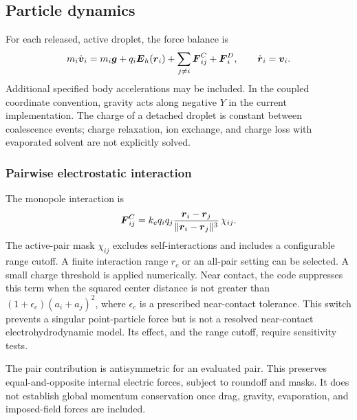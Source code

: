 \subsection{Particle dynamics}
For each released, active droplet, the force balance is
\begin{equation}
 m_i\dot{\boldsymbol{v}}_i=
 m_i\boldsymbol{g}+q_i\boldsymbol{E}_h(\boldsymbol{r}_i)
 +\sum_{j\ne i}\boldsymbol{F}^{C}_{ij}
 +\boldsymbol{F}^D_i,\qquad \dot{\boldsymbol{r}}_i=\boldsymbol{v}_i.
\label{eq:motion}
\end{equation}
Additional specified body accelerations may be included. In the coupled coordinate convention, gravity acts along negative $Y$ in the current implementation. The charge of a detached droplet is constant between coalescence events; charge relaxation, ion exchange, and charge loss with evaporated solvent are not explicitly solved.

\subsubsection{Pairwise electrostatic interaction}
The monopole interaction is
\begin{equation}
 \boldsymbol{F}^{C}_{ij}=k_e q_iq_j
 \frac{\boldsymbol{r}_i-\boldsymbol{r}_j}{\|\boldsymbol{r}_i-\boldsymbol{r}_j\|^3}\,\chi_{ij}.
\label{eq:coulomb}
\end{equation}
The active-pair mask $\chi_{ij}$ excludes self-interactions and includes a configurable range cutoff. A finite interaction range $r_c$ or an all-pair setting can be selected. A small charge threshold is applied numerically. Near contact, the code suppresses this term when the squared center distance is not greater than $(1+\epsilon_c)(a_i+a_j)^2$, where $\epsilon_c$ is a prescribed near-contact tolerance. This switch prevents a singular point-particle force but is not a resolved near-contact electrohydrodynamic model. Its effect, and the range cutoff, require sensitivity tests.

The pair contribution is antisymmetric for an evaluated pair. This preserves equal-and-opposite internal electric forces, subject to roundoff and masks. It does not establish global momentum conservation once drag, gravity, evaporation, and imposed-field forces are included.

